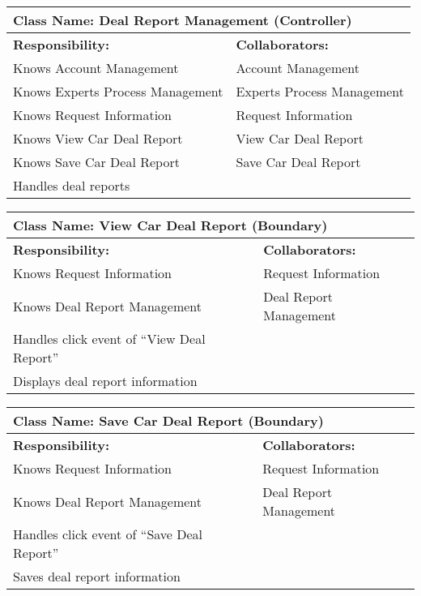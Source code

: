 \documentclass[]{article}
\begin{document}
\begin{itemize}
    \begin{table}[H]
        \centering
        \begin{tabular}{|p{5cm}|p{5cm}|}
        \hline 
         \multicolumn{2}{|l|}{\textbf{Class Name: Deal Report Management (Controller)}} \\
        \hline
        \textbf{Responsibility:} & \textbf{Collaborators:} \\
        \hline
        Knows Account Management & Account Management \\
        Knows Experts Process Management & Experts Process Management \\
        Knows Request Information & Request Information \\
        Knows View Car Deal Report & View Car Deal Report \\
        Knows Save Car Deal Report & Save Car Deal Report \\
        Handles deal reports & \\
        \hline
        \end{tabular}
    \end{table}
    
    \begin{table}[H]
        \centering
        \begin{tabular}{|p{5cm}|p{5cm}|}
        \hline 
         \multicolumn{2}{|l|}{\textbf{Class Name: View Car Deal Report (Boundary)}} \\
        \hline
        \textbf{Responsibility:} & \textbf{Collaborators:} \\
        \hline
        Knows Request Information & Request Information \\
        Knows Deal Report Management & Deal Report Management \\
        Handles click event of “View Deal Report” & \\
        Displays deal report information & \\
        \hline
        \end{tabular}
    \end{table}
    
    \begin{table}[H]
        \centering
        \begin{tabular}{|p{5cm}|p{5cm}|}
        \hline 
         \multicolumn{2}{|l|}{\textbf{Class Name: Save Car Deal Report (Boundary)}} \\
        \hline
        \textbf{Responsibility:} & \textbf{Collaborators:} \\
        \hline
        Knows Request Information & Request Information \\
        Knows Deal Report Management & Deal Report Management \\
        Handles click event of “Save Deal Report” & \\
        Saves deal report information & \\
        \hline
        \end{tabular}
    \end{table}

\end{itemize}
\end{document}
